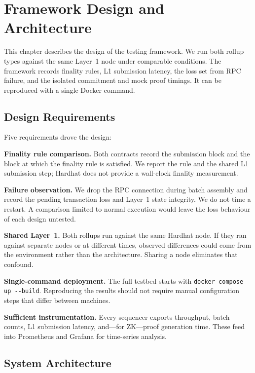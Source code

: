 \chapter{Framework Design and Architecture}
\label{ch:framework}

This chapter describes the design of the testing framework. We run both rollup types against the same Layer~1 node under comparable conditions. The framework records finality rules, L1 submission latency, the loss set from RPC failure, and the isolated commitment and mock proof timings. It can be reproduced with a single Docker command.

\section{Design Requirements}

Five requirements drove the design:

\textbf{Finality rule comparison.} Both contracts record the submission block and the block at which the finality rule is satisfied. We report the rule and the shared L1 submission step; Hardhat does not provide a wall-clock finality measurement.

\textbf{Failure observation.} We drop the RPC connection during batch assembly and record the pending transaction loss and Layer~1 state integrity. We do not time a restart. A comparison limited to normal execution would leave the loss behaviour of each design untested.

\textbf{Shared Layer~1.} Both rollups run against the same Hardhat node. If they ran against separate nodes or at different times, observed differences could come from the environment rather than the architecture. Sharing a node eliminates that confound.

\textbf{Single-command deployment.} The full testbed starts with \texttt{docker compose up -{}-build}. Reproducing the results should not require manual configuration steps that differ between machines.

\textbf{Sufficient instrumentation.} Every sequencer exports throughput, batch counts, L1 submission latency, and—for ZK—proof generation time. These feed into Prometheus and Grafana for time-series analysis.

\section{System Architecture}

